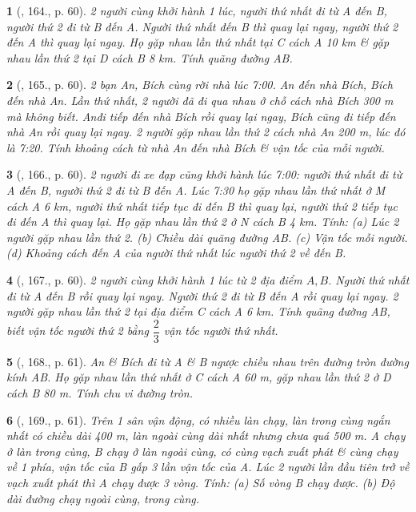 \documentclass{article}
\newtheorem{baitoan}{}
\begin{document}
\begin{baitoan}[\cite{Binh_Toan_6_tap_2}, 164., p. 60]
	2 người cùng khởi hành 1 lúc, người thứ nhất đi từ A đến B, người thứ 2 đi từ B đến A. Người thứ nhất đến B thì quay lại ngay, người thứ 2 đến A thì quay lại ngay. Họ gặp nhau lần thứ nhất tại C cách A {\rm10 km} \& gặp nhau lần thứ 2 tại D cách B {\rm8 km}. Tính quãng đường AB.
\end{baitoan}

\begin{baitoan}[\cite{Binh_Toan_6_tap_2}, 165., p. 60]
	2 bạn An, Bích cùng rời nhà lúc {\rm7:00}. An đến nhà Bích, Bích đến nhà An. Lần thứ nhất, 2 người đã đi qua nhau ở chỗ cách nhà Bích {\rm300 m} mà không biết. Anđi tiếp đến nhà Bích rồi quay lại ngay, Bích cũng đi tiếp đến nhà An rồi quay lại ngay. 2 người gặp nhau lần thứ 2 cách nhà An {\rm200 m}, lúc đó là {\rm7:20}. Tính khoảng cách từ nhà An đến nhà Bích \& vận tốc của mỗi người.
\end{baitoan}

\begin{baitoan}[\cite{Binh_Toan_6_tap_2}, 166., p. 60]
	2 người đi xe đạp cũng khởi hành lúc {\rm7:00}: người thứ nhất đi từ A đến B, người thứ 2 đi từ B đến A. Lúc {\rm7:30} họ gặp nhau lần thứ nhất ở M cách A {\rm6 km}, người thứ nhất tiếp tục đi đến B thì quay lại, người thứ 2 tiếp tục đi đến A thì quay lại. Họ gặp nhau lần thứ 2 ở N cách B {\rm4 km}. Tính: (a) Lúc 2 người gặp nhau lần thứ 2. (b) Chiều dài quãng đường AB. (c) Vận tốc mỗi người. (d) Khoảng cách đến A của người thứ nhất lúc người thứ 2 về đến B.
\end{baitoan}

\begin{baitoan}[\cite{Binh_Toan_6_tap_2}, 167., p. 60]
	2 người cùng khởi hành 1 lúc từ 2 địa điểm $A,B$. Người thứ nhất đi từ A đến B rồi quay lại ngay. Người thứ 2 đi từ B đến A rồi quay lại ngay. 2 người gặp nhau lần thứ 2 tại địa điểm C cách A {\rm6 km}. Tính quãng đường AB, biết vận tốc người thứ 2 bằng $\dfrac{2}{3}$ vận tốc người thứ nhất.
\end{baitoan}

\begin{baitoan}[\cite{Binh_Toan_6_tap_2}, 168., p. 61]
	An \& Bích đi từ A \& B ngược chiều nhau trên đường tròn đường kính AB. Họ gặp nhau lần thứ nhất ở C cách A {\rm60 m}, gặp nhau lần thứ 2 ở D cách B {\rm80 m}. Tính chu vi đường tròn.
\end{baitoan}

\begin{baitoan}[\cite{Binh_Toan_6_tap_2}, 169., p. 61]
	Trên 1 sân vận động, có nhiều làn chạy, làn trong cùng ngắn nhất có chiều dài {\rm400 m}, làn ngoài cùng dài nhất nhưng chưa quá {\rm500 m}. A chạy ở làn trong cùng, B chạy ở làn ngoài cùng, có cùng vạch xuất phát \& cùng chạy về 1 phía, vận tốc của B gấp 3 lần vận tốc của A. Lúc 2 người lần đầu tiên trở về vạch xuất phát thì A chạy được 3 vòng. Tính: (a) Số vòng B chạy được. (b) Độ dài đường chạy ngoài cùng, trong cùng.
\end{baitoan}
\end{document}
